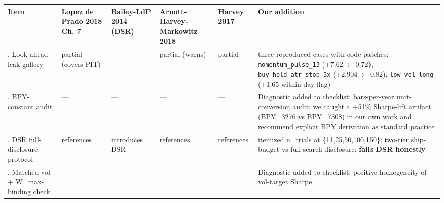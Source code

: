 \documentclass[
]{article}
\newcounter{none} %
\begin{document}
{\def\LTcaptype{none} %
\begin{longtable}[]{@{}
  >{\raggedright\arraybackslash}p{}
  >{\centering\arraybackslash}p{}
  >{\centering\arraybackslash}p{}
  >{\centering\arraybackslash}p{}
  >{\centering\arraybackslash}p{}
  >{\raggedright\arraybackslash}p{}@{}}
\toprule\noalign{}
\begin{minipage}[b]{\linewidth}\raggedright
Item
\end{minipage} & \begin{minipage}[b]{\linewidth}\centering
Lopez de Prado 2018 Ch. 7
\end{minipage} & \begin{minipage}[b]{\linewidth}\centering
Bailey-LdP 2014 (DSR)
\end{minipage} & \begin{minipage}[b]{\linewidth}\centering
Arnott-Harvey-Markowitz 2018
\end{minipage} & \begin{minipage}[b]{\linewidth}\centering
Harvey 2017
\end{minipage} & \begin{minipage}[b]{\linewidth}\raggedright
Our addition
\end{minipage} \\
\midrule\noalign{}
\endhead
\bottomrule\noalign{}
\endlastfoot
1. Look-ahead-leak gallery & partial (covers PIT) & --- & partial
(warns) & partial & three reproduced cases with code patches:
\texttt{momentum\_pulse\_13} (+7.62→−0.72),
\texttt{buy\_hold\_atr\_stop\_3x} (+2.904→+0.82),
\texttt{low\_vol\_long} (+1.65 within-day flag) \\
2. BPY-constant audit & --- & --- & --- & --- & Diagnostic added to
checklist: bars-per-year unit-conversion audit; we caught a +51\%
Sharpe-lift artifact (BPY=3276 vs BPY=7308) in our own work and
recommend explicit BPY derivation as standard practice \\
3. DSR full-disclosure protocol & references & introduces DSR &
references & references & itemized n\_trials at \{11,25,50,100,150\};
two-tier ship-budget vs full-search disclosure; \textbf{fails DSR
honestly} \\
4. Matched-vol + W\_max-binding check & --- & --- & --- & --- &
Diagnostic added to checklist: positive-homogeneity of vol-target Sharpe

\end{longtable}}
\end{document}
